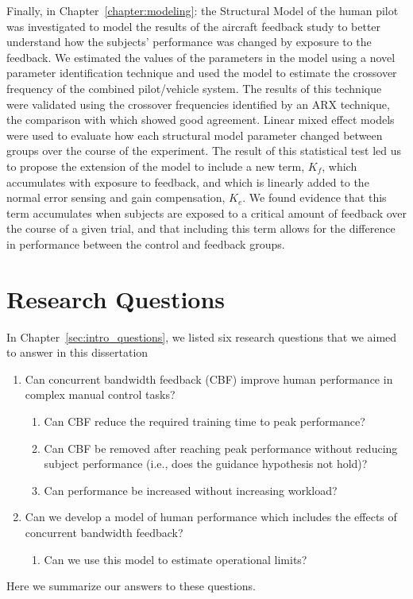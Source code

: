 Finally, in Chapter~\ref{chapter:modeling}:  the Structural Model of the human pilot was investigated to model the results of the aircraft feedback study to better understand how the subjects' performance was changed by exposure to the feedback.
We estimated the values of the parameters in the model using a novel parameter identification technique and used the model to estimate the crossover frequency of the combined pilot/vehicle system.
The results of this technique were validated using the crossover frequencies identified by an ARX technique, the comparison with which showed good agreement.
Linear mixed effect models were used to evaluate how each structural model parameter changed between groups over the course of the experiment.
The result of this statistical test led us to propose the extension of the model to include a new term, $K_f$, which accumulates with exposure to feedback, and which is linearly added to the normal error sensing and gain compensation, $K_e$.
We found evidence that this term accumulates when subjects are exposed to a critical amount of feedback over the course of a given trial, and that including this term allows for the difference in performance between the control and feedback groups.

\section{Research Questions}

In Chapter~\ref{sec:intro_questions}, we listed six research questions that we aimed to answer in this dissertation
\begin{enumerate}
    \item Can concurrent bandwidth feedback (CBF) improve human performance in complex manual control tasks?
          \begin{enumerate}
              \item Can CBF reduce the required training time to peak performance?
              \item Can CBF be removed after reaching peak performance without reducing subject performance (i.e., does the guidance hypothesis not hold)?
              \item Can performance be increased without increasing workload?
          \end{enumerate}
    \item Can we develop a model of human performance which includes the effects of concurrent bandwidth feedback?
          \begin{enumerate}
              \item Can we use this model to estimate operational limits?
          \end{enumerate}
\end{enumerate}
Here we summarize our answers to these questions.

